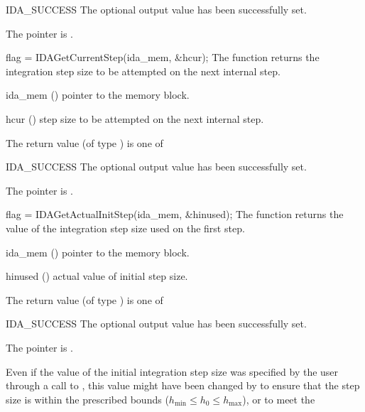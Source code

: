 {{  \begin{args}
  \item[IDA\_SUCCESS]
    The optional output value has been successfully set.
  \item[\Id{IDA\_MEM\_NULL}]
    The  pointer is .
  \end{args}
}
{}
{
  flag = IDAGetCurrentStep(ida\_mem, \&hcur);
}
{
  The function  returns the
  integration step size to be attempted on the next internal step.
}
{
  \begin{args}
  \item[ida\_mem] ()
    pointer to the {\ida} memory block.
  \item[hcur] ()
    step size to be attempted on the next internal step.
  \end{args}
}
{
  The return value  (of type ) is one of
  \begin{args}
  \item[IDA\_SUCCESS]
    The optional output value has been successfully set.
  \item[\Id{IDA\_MEM\_NULL}]
    The  pointer is .
  \end{args}
}
{}
{
  flag = IDAGetActualInitStep(ida\_mem, \&hinused);
}
{
  The function  returns the
  value of the integration step size used on the first step.
}
{
  \begin{args}
  \item[ida\_mem] ()
    pointer to the {\ida} memory block.
  \item[hinused] ()
    actual value of initial step size.
  \end{args}
}
{
  The return value  (of type ) is one of
  \begin{args}
  \item[IDA\_SUCCESS]
    The optional output value has been successfully set.
  \item[\Id{IDA\_MEM\_NULL}]
    The  pointer is .
  \end{args}
}
{
  Even if the value of the initial integration step size was specified
  by the user through a call to , this value might have
  been changed by {\ida} to ensure that the step size is within the
  prescribed bounds ($h_{\min} \le h_0 \le h_{\max}$), or to meet the
}}
